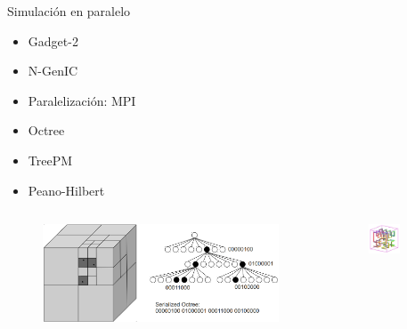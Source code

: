 \documentclass{beamer}
\begin{document}
\begin{frame}{Simulación en paralelo}
	\begin{block}{}
		\begin{itemize}
			\item Gadget-2
			\item N-GenIC
			\item Paralelización: MPI
			\item Octree
			\item TreePM
			\item Peano-Hilbert
		\end{itemize}
	\end{block}
	\begin{columns}
		\begin{column}{0.5\textwidth}
			\begin{figure}[!h]
			\begin{center}
				\includegraphics[width=\textwidth]{im/octree_encode}
				\label{fig:oct}
			\end{center}
		\end{figure}
		\end{column}
		
		\begin{column}{0.5\textwidth}
			\begin{figure}[!h]
			\begin{center}
				\includegraphics[width=0.6\textwidth]{im/hilbert3d01}
				\label{fig:pen}
			\end{center}
		\end{figure}
		\end{column}
	\end{columns}
\end{frame}
\end{document}
